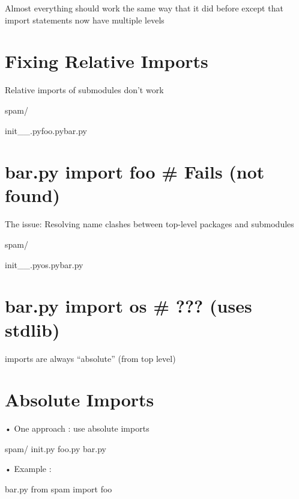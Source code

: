 \documentclass[
  letterpaper,
  DIV=11,
  numbers=noendperiod]{scrreprt}
\newenvironment{Shaded}{\begin{snugshade}}{\end{snugshade}}
\newcommand{\NormalTok}[1]{\textcolor[rgb]{0.00,0.23,0.31}{#1}}
\begin{document}
Almost everything should work the same way that it did before except
that import statements now have multiple levels


\chapter{Fixing Relative Imports}\label{fixing-relative-imports}

Relative imports of submodules don't work

spam/

init\_\_.pyfoo.pybar.py


\chapter{bar.py import foo \# Fails (not
found)}\label{bar.py-import-foo-fails-not-found}

The issue: Resolving name clashes between top-level packages and
submodules

spam/

init\_\_.pyos.pybar.py


\chapter{bar.py import os \# ??? (uses
stdlib)}\label{bar.py-import-os-uses-stdlib}

imports are always ``absolute'' (from top level)


\chapter{Absolute Imports}\label{absolute-imports}

• One approach : use absolute imports

\begin{Shaded}
\begin{Highlighting}[]
\NormalTok{spam/ init.py foo.py bar.py }
\end{Highlighting}
\end{Shaded}

• Example :

\begin{Shaded}
\begin{Highlighting}[]
\NormalTok{bar.py from spam import foo }
\end{Highlighting}
\end{Shaded}
\end{document}
